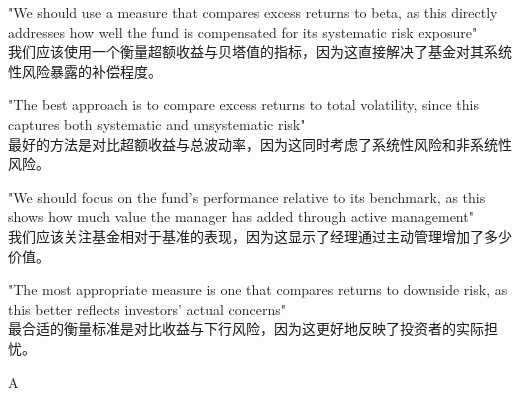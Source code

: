 \documentclass{article}
\begin{document}
\begin{choices}
    \item "We should use a measure that compares excess returns to beta, as this directly addresses how well the fund is compensated for its systematic risk exposure"
    \\
    我们应该使用一个衡量超额收益与贝塔值的指标，因为这直接解决了基金对其系统性风险暴露的补偿程度。
    \item "The best approach is to compare excess returns to total volatility, since this captures both systematic and unsystematic risk"
    \\
    最好的方法是对比超额收益与总波动率，因为这同时考虑了系统性风险和非系统性风险。
    \item "We should focus on the fund's performance relative to its benchmark, as this shows how much value the manager has added through active management"
    \\
    我们应该关注基金相对于基准的表现，因为这显示了经理通过主动管理增加了多少价值。
    \item "The most appropriate measure is one that compares returns to downside risk, as this better reflects investors' actual concerns"
    \\
    最合适的衡量标准是对比收益与下行风险，因为这更好地反映了投资者的实际担忧。
\end{choices}

\begin{correctanswer}
    A
\end{correctanswer}
\end{document}
